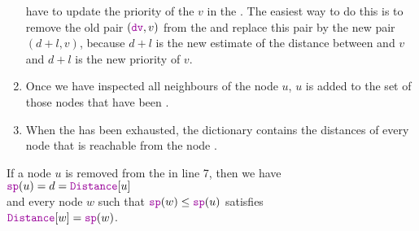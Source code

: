 \begin{enumerate}
      have to update the priority of the $v$ in the .  The easiest way to do this is to remove
      the old pair $(\mytt{dv}, v)$ from the  and replace this pair by the new pair
      $(d+l, v)$, because $d+l$ is the new estimate of the distance between  and $v$ and
      $d+l$ is the new priority of $v$.
\item Once we have inspected all neighbours of the node $u$, $u$ is added to the set of those nodes that have
      been .
\item When the  has been exhausted, the dictionary  contains the distances of
      every node that is reachable from the node .  
\end{enumerate}

\begin{Theorem}
  If a node $u$ is removed from the  in line 7, then we have
  \\[0.2cm]
  \hspace*{1.3cm}
  $\mytt{sp}(u) = d = \mytt{Distance}[u]$
  \\[0.2cm]
  and every node $w$ such that $\mytt{sp}(w) \leq \mytt{sp}(u)$ satisfies
  \\[0.2cm]
  \hspace*{1.3cm}
  $\mytt{Distance}[w] = \mytt{sp}(w)$.
\end{Theorem}


